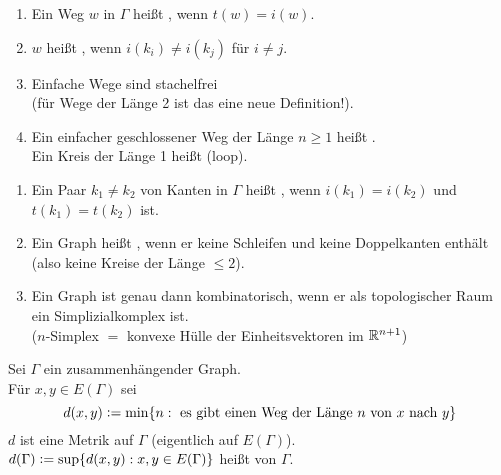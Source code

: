 \documentclass[a4paper, 10pt]{report}
\begin{document}
\begin{DefBem}
\begin{enumerate}
  \item Ein Weg $w \textrm{ in } \Gamma$ heißt , wenn $t(w) = i(w)$.
  \item $w$ heißt , wenn $i(k_i) \not= i(k_j)$ für $i \not= j$.
  \item Einfache Wege sind stachelfrei \\
  (für Wege der Länge 2 ist das eine neue Definition!).
  \item Ein einfacher geschlossener Weg der Länge $n \ge 1$ heißt .\\
  Ein Kreis der Länge 1 heißt  (loop).\\
\end{enumerate}
\end{DefBem}

\begin{DefBem}
\begin{enumerate}
  \item Ein Paar $k_1 \not= k_2$ von Kanten in $\Gamma$ heißt , wenn
  $i(k_1) = i(k_2)$ und $t(k_1) = t(k_2)$ ist.
  \item Ein Graph heißt , wenn er keine Schleifen und keine
  Doppelkanten enthält (also keine Kreise der Länge $\le 2$).
  \item Ein Graph ist genau dann kombinatorisch, wenn er als topologischer Raum
  ein Simplizialkomplex ist.\\
  ($n$-Simplex $=$ konvexe Hülle der Einheitsvektoren im $\mathbb{R}^{n+1}$)
\end{enumerate}
\end{DefBem}

\begin{DefBem}
Sei $\Gamma$ ein zusammenhängender Graph.\\
Für $x,y \in E(\Gamma)$ sei
$$d(x,y) \mathrel{\mathop:}= \min\{n: \textrm{ es gibt einen Weg der Länge } n \textrm{ von 
} x \textrm{ nach } y \}$$
$d$ ist eine Metrik auf $\Gamma$ (eigentlich auf $E(\Gamma)$).\\
$d(\Gamma) \mathrel{\mathop:}= \sup\{d(x,y): x,y \in E(\Gamma) \}$ heißt  von $\Gamma$.
\end{DefBem}
\end{document}
